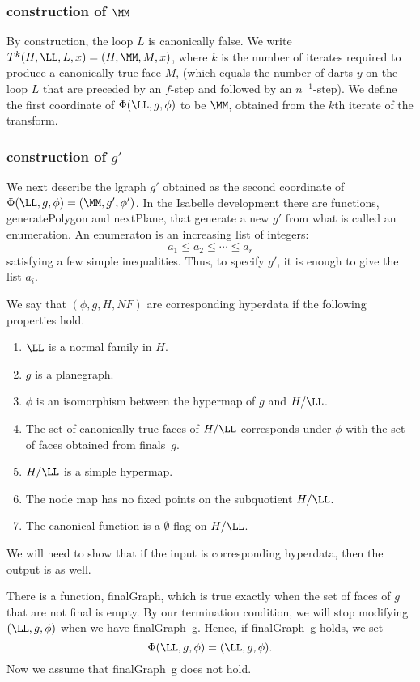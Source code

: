 \subsubsection{construction of $\MM$}

By construction, the loop $L$ is canonically false.
We write $T^k(H,\LL,L,x) = (H,\MM,M,x)$, where $k$ is
the number of iterates required to produce a canonically
true face $M$, (which equals the number of darts $y$ 
on the loop $L$
that are preceded by an $f$-step and followed by an $n^{-1}$-step).
We define the first coordinate of $\Phi(\LL,g,\phi)$ to be $\MM$,
obtained from the $k$th iterate of the transform.

\subsubsection{construction of $g'$}

We next describe the lgraph $g'$ obtained as the second
coordinate of $\Phi(\LL,g,\phi) = (\MM,g',\phi')$.  
In the Isabelle development there are functions, generatePolygon
and nextPlane, that generate a new $g'$ from what is called
an enumeration.  An enumeraton is an increasing list of integers:
\[
a_1\le a_2\le\cdots \le a_r
\]
satisfying a few simple inequalities.   
Thus, to specify $g'$, it is enough to give the list $a_i$.

We say that $(\phi,g,H,NF)$ are corresponding hyperdata if
the following properties hold.
\begin{enumerate}
\item $\LL$ is a normal family in $H$.
\item $g$ is a planegraph.
\item $\phi$ is an isomorphism between the hypermap of $g$  and
$H/\LL$.  
\item  The set of canonically true faces of $H/\LL$
corresponds under $\phi$ with the set of faces obtained from 
finals~$g$.  
\item  $H/\LL$ is a simple hypermap.
\item The node map has no fixed points on the subquotient $H/\LL$.
\item The canonical function is a $\emptyset$-flag on $H/\LL$.
\end{enumerate}

We will need to show that if the input is corresponding hyperdata, then
the output is as well.

There is a function, finalGraph, which is true exactly when
the set of faces of $g$ that are not final is empty.  By our
termination condition, we will stop modifying $(\LL,g,\phi)$
when we have finalGraph~g.  Hence, if finalGraph~g holds, we
set
\[
\Phi(\LL,g,\phi) = (\LL,g,\phi).
\]
Now we assume that finalGraph~g does not hold.

